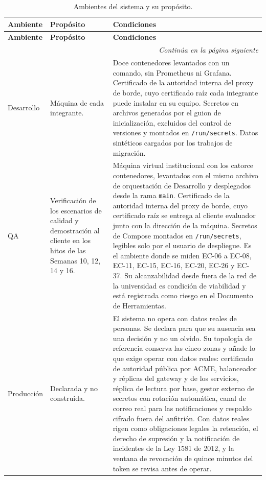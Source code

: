 \documentclass[11pt,a4paper]{article}
\newcommand{\contlinea}[1]{\multicolumn{#1}{r}{\footnotesize\itshape Continúa en la página siguiente}}
\begin{document}
\begin{longtable}{L{2.2cm} L{4.2cm} L{7.8cm}}
\caption{Ambientes del sistema y su propósito.}\label{tab:ambientes}\\
\toprule
\textbf{Ambiente} & \textbf{Propósito} & \textbf{Condiciones} \\
\midrule
\endfirsthead
\toprule
\textbf{Ambiente} & \textbf{Propósito} & \textbf{Condiciones} \\
\midrule
\endhead
\midrule
\contlinea{3} \\
\endfoot
\bottomrule
\endlastfoot
Desarrollo & Máquina de cada integrante. & Doce contenedores levantados con un comando, sin Prometheus ni Grafana. Certificado de la autoridad interna del proxy de borde, cuyo certificado raíz cada integrante puede instalar en su equipo. Secretos en archivos generados por el guion de inicialización, excluidos del control de versiones y montados en \texttt{/run/secrets}. Datos sintéticos cargados por los trabajos de migración. \\
QA & Verificación de los escenarios de calidad y demostración al cliente en los hitos de las Semanas 10, 12, 14 y 16. & Máquina virtual institucional con los catorce contenedores, levantados con el mismo archivo de orquestación de Desarrollo y desplegados desde la rama \texttt{main}. Certificado de la autoridad interna del proxy de borde, cuyo certificado raíz se entrega al cliente evaluador junto con la dirección de la máquina. Secretos de Compose montados en \texttt{/run/secrets}, legibles solo por el usuario de despliegue. Es el ambiente donde se miden EC-06 a EC-08, EC-11, EC-15, EC-16, EC-20, EC-26 y EC-37. Su alcanzabilidad desde fuera de la red de la universidad es condición de viabilidad y está registrada como riesgo en el Documento de Herramientas. \\
Producción & Declarada y no construida. & El sistema no opera con datos reales de personas. Se declara para que su ausencia sea una decisión y no un olvido. Su topología de referencia conserva las cinco zonas y añade lo que exige operar con datos reales: certificado de autoridad pública por ACME, balanceador y réplicas del gateway y de los servicios, réplica de lectura por base, gestor externo de secretos con rotación automática, canal de correo real para las notificaciones y respaldo cifrado fuera del anfitrión. Con datos reales rigen como obligaciones legales la retención, el derecho de supresión y la notificación de incidentes de la Ley 1581 de 2012, y la ventana de revocación de quince minutos del token se revisa antes de operar. \\
\end{longtable}
\end{document}
